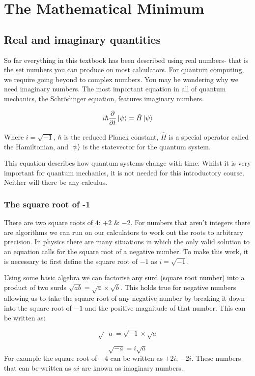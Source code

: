 \documentclass{book}
\begin{document}
\chapter{The Mathematical Minimum}
\section{Real and imaginary quantities}

So far everything in this textbook has been described using real numbers- that is the set numbers you can produce on most calculators. For quantum computing, we require going beyond to complex numbers. You may be wondering why we need imaginary numbers. The most important equation in all of quantum mechanics, the Schrödinger equation, features imaginary numbers. 

$$ i\hbar \frac{\partial{}}{\partial{t}}\ket{\psi} = \hat{H}\ket{\psi} $$

Where $i = \sqrt{-1}$, $\hbar$ is the reduced Planck constant, $\hat{H}$ is a special operator called the Hamiltonian, and $\ket{\psi}$ is the statevector for the quantum system. 

This equation describes how quantum systems change with time. Whilst it is very important for quantum mechanics, it is not needed for this introductory course. Neither will there be any calculus.

\subsection{ The square root of -1}

There are two square roots of $4$: $+2$ \& $-2$. For numbers that aren't integers there are algorithms we can run on our calculators to work out the roots to arbitrary precision. In physics there are many situations in which the only valid solution to an equation calls for the square root of a negative number. To make this work, it is necessary to first define the square root of $-1$ as $i = \sqrt{-1}$. 

Using some basic algebra we can factorise any surd (square root number) into a product of two surds $ \sqrt{ab} = \sqrt{a} \times \sqrt{b}$. This holds true for negative numbers allowing us to take the square root of any negative number by breaking it down into the square root of $-1$ and the positive magnitude of that number. This can be written as:

$$ \sqrt{-a} = \sqrt{-1} \times \sqrt{a} $$

$$ \sqrt{-a} = i \sqrt{a} $$
For example the square root of $-4$ can be written as $+2i$, $-2i$.
These numbers that can be written as $ai$ are known as imaginary numbers. 
\end{document}
